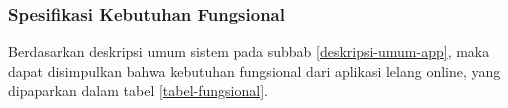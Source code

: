   \subsubsection{Spesifikasi Kebutuhan Fungsional}
  \label{keb-fungsional}
	Berdasarkan deskripsi umum sistem pada subbab \ref{deskripsi-umum-app}, maka dapat disimpulkan bahwa kebutuhan fungsional dari aplikasi lelang online, yang dipaparkan dalam tabel \ref{tabel-fungsional}.

  